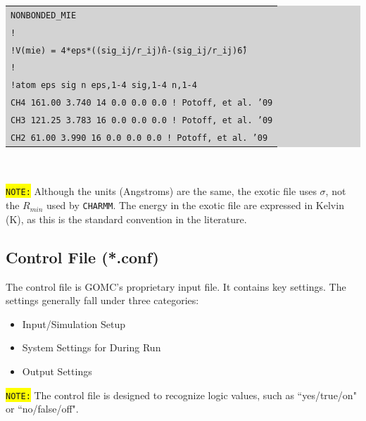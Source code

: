 \colorbox{lightgray}{
\begin{tabular}{l}
\texttt{NONBONDED\_MIE}\\
\texttt{!}\\
\texttt{!V(mie) = 4*eps*((sig\_ij/r\_ij)\^n-(sig\_ij/r\_ij)\^6)}\\
\texttt{!}\\
\texttt{!atom   eps          sig        n    eps,1-4    sig,1-4     n,1-4 }\\
\texttt{CH4     161.00       3.740      14   0.0 0.0 0.0 ! Potoff, et al. '09}\\
\texttt{CH3     121.25       3.783      16   0.0 0.0 0.0 ! Potoff, et al. '09}\\
\texttt{CH2       61.00       3.990      16   0.0 0.0 0.0 ! Potoff, et al. '09}\\
\end{tabular}}\\\\
\colorbox{yellow}{\texttt{NOTE:}} Although the units (Angstroms) are the same, the exotic file uses $\sigma$, not the $R_{min}$ used by \texttt{CHARMM}. The energy in the exotic file are expressed in Kelvin (K), as this is the standard convention in the literature.\\
\newpage
\subsection{Control File (*.conf)}
The control file is GOMC's proprietary input file. It contains key settings. The settings generally fall under three categories:
\begin{itemize}
\item Input/Simulation Setup
\item System Settings for During Run
\item Output Settings
\end{itemize}
\colorbox{yellow}{\texttt{NOTE:}} The control file is designed to recognize logic values, such as ``yes/true/on" or ``no/false/off".\\
